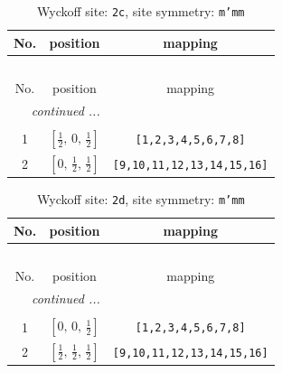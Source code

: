 \documentclass[fleqn,8pt]{jsarticle}
\begin{document}
\renewcommand{\arraystretch}{1.2}
\begin{longtable}{ccc}
\caption{Wyckoff site: {\tt 2c}, site symmetry: {\tt m'mm}}
 \\
 \hline \hline
No. & position & mapping \\ \hline \endfirsthead

\multicolumn{2}{l}{\tablename\ \thetable{}} \\
 \hline \hline
No. & position & mapping \\ \hline \endhead

 \hline \hline
\multicolumn{2}{r}{\footnotesize\it continued ...} \\ \endfoot

 \hline \hline
\multicolumn{2}{r}{} \\ \endlastfoot

1 & $\left[ \frac{1}{2},\, 0,\, \frac{1}{2} \right]$ & {\tt [1,2,3,4,5,6,7,8]} \\ \hline
2 & $\left[ 0,\, \frac{1}{2},\, \frac{1}{2} \right]$ & {\tt [9,10,11,12,13,14,15,16]} \\
\end{longtable}
\renewcommand{\arraystretch}{1.2}
\begin{longtable}{ccc}
\caption{Wyckoff site: {\tt 2d}, site symmetry: {\tt m'mm}}
 \\
 \hline \hline
No. & position & mapping \\ \hline \endfirsthead

\multicolumn{2}{l}{\tablename\ \thetable{}} \\
 \hline \hline
No. & position & mapping \\ \hline \endhead

 \hline \hline
\multicolumn{2}{r}{\footnotesize\it continued ...} \\ \endfoot

 \hline \hline
\multicolumn{2}{r}{} \\ \endlastfoot

1 & $\left[ 0,\, 0,\, \frac{1}{2} \right]$ & {\tt [1,2,3,4,5,6,7,8]} \\ \hline
2 & $\left[ \frac{1}{2},\, \frac{1}{2},\, \frac{1}{2} \right]$ & {\tt [9,10,11,12,13,14,15,16]} \\
\end{longtable}
\renewcommand{\arraystretch}{1.2}
\end{document}
